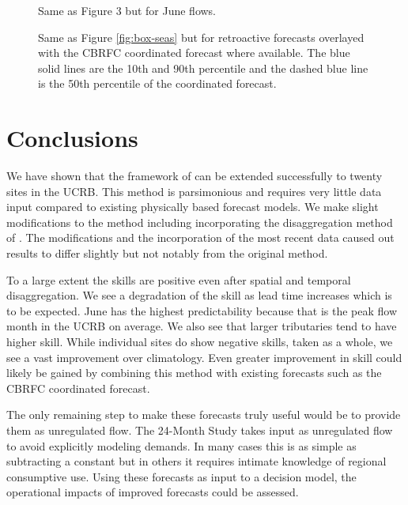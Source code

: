 \documentclass[final,5p,times,twocolumn,authoryear]{elsarticle}
\begin{document}
\begin{figure*}[htbp] %
   \centering
   
   \caption{Same as Figure 3 but for June flows.}
   \label{fig:box}
\end{figure*}

\begin{figure*}[htbp] %
   \centering
    
   \caption{Same as Figure \ref{fig:box-seas} but for retroactive forecasts overlayed with the CBRFC coordinated forecast where available. The blue solid lines are the 10th and 90th percentile and the dashed blue line is the 50th percentile of the coordinated forecast.}
   \label{fig:box-retro}
\end{figure*}
 
%
 
\section{Conclusions}

We have shown that the framework of \cite{Bracken:2010cw} can be extended successfully to twenty sites in the UCRB. This method is parsimonious and requires very little data input compared to existing physically based forecast models.  We make slight modifications to the method including incorporating the disaggregation method of \cite{Nowak:2010ha}. The modifications and the incorporation of the most recent data caused out results to differ slightly but not notably from the original method. 

To a large extent the skills are positive even after spatial and temporal disaggregation. We see a degradation of the skill as lead time increases which is to be expected. June has the highest predictability because that is the peak flow month in the UCRB on average. We also see that larger tributaries tend to have higher skill. While individual sites do show negative skills, taken as a whole, we see a vast improvement over climatology.   Even greater improvement in skill could likely be gained by combining this method with existing forecasts such as the CBRFC coordinated forecast.

The only remaining step to make these forecasts truly useful would be to provide them as unregulated flow. The 24-Month Study takes input as unregulated flow to avoid explicitly modeling demands. In many cases this is as simple as subtracting a constant but in others it requires intimate knowledge of regional consumptive use.  Using these forecasts as input to a decision model, the operational impacts of improved forecasts could be assessed.  

\newpage



\end{document}
